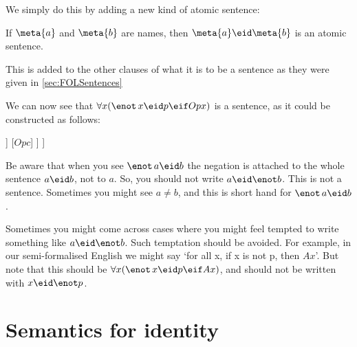We simply do this by adding a new kind of atomic sentence: \begin{highlighted}If $\meta{a}$ and $\meta{b}$ are names, then $\meta{a}\eid \meta{b}$ is an atomic sentence.\end{highlighted}
This is added to the other clauses of what it is to be a sentence as they were given in \cref{sec:FOLSentences}

We can now see that $\forall x (\enot\, x\eid p \eif Opx)$ is a sentence, as it could be constructed as follows:	\begin{center}
	\begin{forest}
		[$\forall x (\enot\, x\eid p \eif Opx)$
			[$(\enot\, c\eid p\eif Opc)$
				[$\enot\, c\eid p$
					[$c\eid p$]
				]
				[$Opc$]
			]
		]
	\end{forest}
	\end{center}

Be aware that when you see $\enot\, a\eid b$ the negation is attached to the whole sentence $a\eid b$, not to $a$. So, you should not write $a\eid\enot b$. This is not a sentence. Sometimes you might see $a\neq b$, and this is short hand for $\enot\, a\eid b$.

Sometimes you might come across cases where you might feel tempted to write something like $a\eid\enot b$. Such temptation should be avoided. For example, in our semi-formalised English we might say `for all x, if x is not p, then $Ax$'. But note that this should be $\forall x(\enot\, x\eid p\eif Ax)$, and should not be written with $x\eid\enot p$.

\section{Semantics for identity}

%

